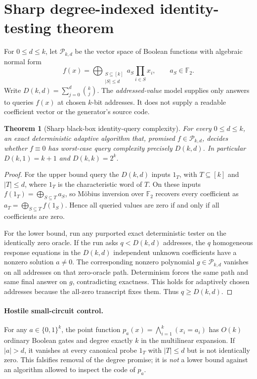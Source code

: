 \documentclass[11pt]{article}
\newtheorem{theorem}{Theorem}
\newcommand{\F}{\mathbb F_2}
\begin{document}
\section{Sharp degree-indexed identity-testing theorem}
For $0\le d\le k$, let $\mathcal P_{k,d}$ be the vector space of Boolean functions with algebraic normal form
\begin{equation}
 f(x)=\bigoplus_{\substack{S\subseteq[k]\\|S|\le d}} a_S\prod_{i\in S}x_i,\qquad a_S\in\F.
 \label{eq:anf}
\end{equation}
Write $D(k,d)=\sum_{j=0}^d\binom{k}{j}$. The \emph{addressed-value} model supplies only answers to queries $f(x)$ at chosen $k$-bit addresses. It does not supply a readable coefficient vector or the generator's source code.
\begin{theorem}[Sharp black-box identity-query complexity]\label{th:rm}
For every $0\le d\le k$, an exact deterministic adaptive algorithm that, promised $f\in\mathcal P_{k,d}$, decides whether $f\equiv0$ has worst-case query complexity precisely $D(k,d)$. In particular $D(k,1)=k+1$ and $D(k,k)=2^k$.
\end{theorem}
\begin{proof}
For the upper bound query the $D(k,d)$ inputs $1_T$, with $T\subseteq[k]$ and $|T|\le d$, where $1_T$ is the characteristic word of $T$. On these inputs $f(1_T)=\bigoplus_{S\subseteq T}a_S$, so M\"obius inversion over $\F$ recovers every coefficient as $a_T=\bigoplus_{S\subseteq T}f(1_S)$. Hence all queried values are zero if and only if all coefficients are zero.

For the lower bound, run any purported exact deterministic tester on the identically zero oracle. If the run asks $q<D(k,d)$ addresses, the $q$ homogeneous response equations in the $D(k,d)$ independent unknown coefficients have a nonzero solution $a\ne0$. The corresponding nonzero polynomial $g\in\mathcal P_{k,d}$ vanishes on all addresses on that zero-oracle path. Determinism forces the same path and same final answer on $g$, contradicting exactness. This holds for adaptively chosen addresses because the all-zero transcript fixes them. Thus $q\ge D(k,d)$.
\end{proof}
\paragraph{Hostile small-circuit control.} For any $a\in\{0,1\}^k$, the point function $p_a(x)=\bigwedge_{i=1}^k(x_i=a_i)$ has $O(k)$ ordinary Boolean gates and degree exactly $k$ in the multilinear expansion. If $|a|>d$, it vanishes at every canonical probe $1_T$ with $|T|\le d$ but is not identically zero. This falsifies removal of the degree promise; it is \emph{not} a lower bound against an algorithm allowed to inspect the code of $p_a$.
\end{document}
